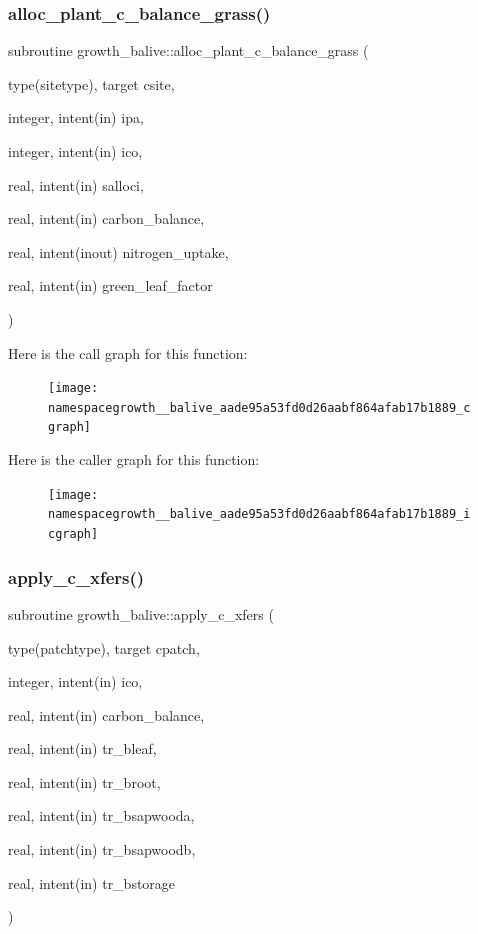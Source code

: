 \subsubsection{\texorpdfstring{alloc\+\_\+plant\+\_\+c\+\_\+balance\+\_\+grass()}{alloc\_plant\_c\_balance\_grass()}}
{\footnotesize\ttfamily subroutine growth\+\_\+balive\+::alloc\+\_\+plant\+\_\+c\+\_\+balance\+\_\+grass (\begin{DoxyParamCaption}\item[{type(sitetype), target}]{csite,  }\item[{integer, intent(in)}]{ipa,  }\item[{integer, intent(in)}]{ico,  }\item[{real, intent(in)}]{salloci,  }\item[{real, intent(in)}]{carbon\+\_\+balance,  }\item[{real, intent(inout)}]{nitrogen\+\_\+uptake,  }\item[{real, intent(in)}]{green\+\_\+leaf\+\_\+factor }\end{DoxyParamCaption})}

Here is the call graph for this function\+:
\nopagebreak
\begin{figure}[H]
\begin{center}
\leavevmode
\texttt{[image: namespacegrowth\_\_balive\_aade95a53fd0d26aabf864afab17b1889\_cgraph]}
\end{center}
\end{figure}
Here is the caller graph for this function\+:
\nopagebreak
\begin{figure}[H]
\begin{center}
\leavevmode
\texttt{[image: namespacegrowth\_\_balive\_aade95a53fd0d26aabf864afab17b1889\_icgraph]}
\end{center}
\end{figure}
\mbox{\label{namespacegrowth__balive_a7a91aeb819248834373b9c7d9bafcbde}} 
\subsubsection{\texorpdfstring{apply\+\_\+c\+\_\+xfers()}{apply\_c\_xfers()}}
{\footnotesize\ttfamily subroutine growth\+\_\+balive\+::apply\+\_\+c\+\_\+xfers (\begin{DoxyParamCaption}\item[{type(patchtype), target}]{cpatch,  }\item[{integer, intent(in)}]{ico,  }\item[{real, intent(in)}]{carbon\+\_\+balance,  }\item[{real, intent(in)}]{tr\+\_\+bleaf,  }\item[{real, intent(in)}]{tr\+\_\+broot,  }\item[{real, intent(in)}]{tr\+\_\+bsapwooda,  }\item[{real, intent(in)}]{tr\+\_\+bsapwoodb,  }\item[{real, intent(in)}]{tr\+\_\+bstorage }\end{DoxyParamCaption})}


